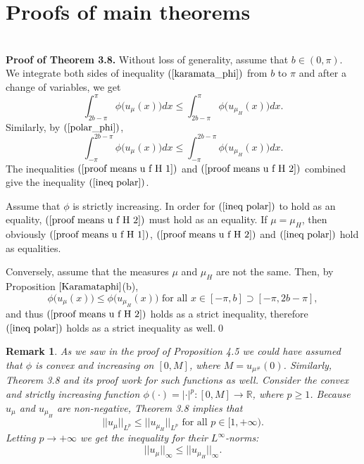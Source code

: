 \documentclass[11pt]{amsart}
\newtheorem{remark}[theorem]{Remark}
\numberwithin{equation}{section}
\begin{document}
\section{Proofs of main theorems}\(\phantom{.}\)\\
\textbf{Proof of Theorem 3.8.} Without loss of generality, assume that \(b\in(0,\pi).\)\\
We integrate both sides of inequality \((\ref{karamata_phi})\) from \(b\) to \(\pi\) and after a change of variables, we get
\begin{equation}\label{proof means u f H 1}
    \int_{2b-\pi}^\pi \phi\bigl(u_\mu(x)\bigr)dx\leq\int_{2b-\pi}^\pi \phi\bigl(u_{\mu_H}(x)\bigr)dx.
\end{equation}
Similarly, by \((\ref{polar_phi})\),
\begin{equation}\label{proof means u f H 2}
    \int_{-\pi}^{2b-\pi} \phi\bigl(u_\mu(x)\bigr)dx\leq\int_{-\pi}^{2b-\pi} \phi\bigl(u_{\mu_H}(x)\bigr)dx.
\end{equation}
The inequalities \((\ref{proof means u f H 1})\) and \((\ref{proof means u f H 2})\) combined give the inequality \((\ref{ineq polar})\).
\par Assume that \(\phi\) is strictly increasing. In order for \((\ref{ineq polar})\) to hold as an equality, \((\ref{proof means u f H 2})\) must hold as an equality. If \(\mu=\mu_H\), then obviously \((\ref{proof means u f H 1})\), \((\ref{proof means u f H 2})\) and \((\ref{ineq polar})\) hold as equalities.
\par Conversely, assume that the measures \(\mu\) and \(\mu_H\) are not the same. Then, by Proposition \(\ref{Karamataphi}\)(b),
\[\phi\bigl(u_\mu(x)\bigr)\leq\phi\bigl(u_{\mu_H}(x)\bigr) \text{ for all } x\in[-\pi,b]\supset[-\pi,2b-\pi],\] 
and thus \((\ref{proof means u f H 2})\) holds as a strict inequality, therefore \((\ref{ineq polar})\) holds as a strict inequality as well.\qed
\begin{remark}\label{remark Lp norms polar}
\textnormal{As we saw in the proof of Proposition 4.5 we could have assumed that \(\phi\) is convex and increasing on \([0,M]\), where \(M=u_{\mu^\#}(0)\). Similarly, Theorem 3.8 and its proof work for such functions as well. Consider the convex and strictly increasing function \(\phi(\cdot)=|\cdot|^p:[0,M]\to\mathbb{R}\), where \(p\geq1\). Because \(u_\mu\) and \(u_{\mu_H}\) are non-negative, Theorem 3.8 implies that
\begin{equation}\label{Lp polar}
||u_\mu||_{L^p}\leq ||u_{\mu_H}||_{L^p} \text{ for all }p\in[1,+\infty).
\end{equation}
Letting \(p\to+\infty\) we get the inequality for their \(L^\infty\)-norms:
\[||u_\mu||_\infty\leq||u_{\mu_H}||_\infty.\]}
\end{remark}
\end{document}
